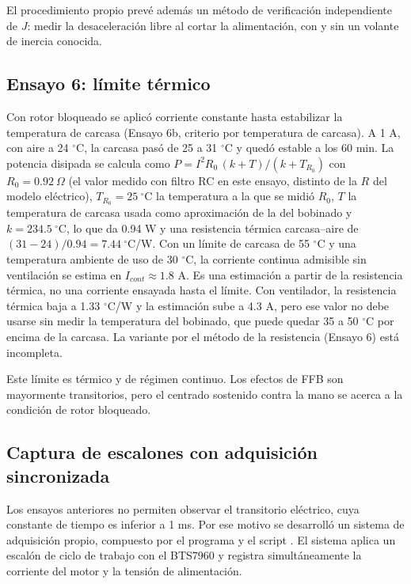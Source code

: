 El procedimiento propio prevé además un método de verificación independiente de $J$: medir la desaceleración libre al cortar la alimentación, con y sin un volante de inercia conocida.

\subsection{Ensayo 6: límite térmico}
\label{sec:motor775_e6}
Con rotor bloqueado se aplicó corriente constante hasta estabilizar la temperatura de carcasa (Ensayo 6b, criterio por temperatura de carcasa). A 1 A, con aire a 24 $^\circ$C, la carcasa pasó de 25 a 31 $^\circ$C y quedó estable a los 60 min. La potencia disipada se calcula como $P = I^2 R_0\,(k + T)/(k + T_{R_0})$ con $R_0 = 0.92\ \Omega$ (el valor medido con filtro RC en este ensayo, distinto de la $R$ del modelo eléctrico), $T_{R_0} = 25\ ^\circ$C la temperatura a la que se midió $R_0$, $T$ la temperatura de carcasa usada como aproximación de la del bobinado y $k = 234.5\ ^\circ$C, lo que da 0.94 W y una resistencia térmica carcasa--aire de $(31 - 24)/0.94 = 7.44\ ^\circ$C/W. Con un límite de carcasa de 55 $^\circ$C y una temperatura ambiente de uso de 30 $^\circ$C, la corriente continua admisible sin ventilación se estima en $I_{cont} \approx 1.8$ A. Es una estimación a partir de la resistencia térmica, no una corriente ensayada hasta el límite. Con ventilador, la resistencia térmica baja a 1.33 $^\circ$C/W y la estimación sube a 4.3 A, pero ese valor no debe usarse sin medir la temperatura del bobinado, que puede quedar 35 a 50 $^\circ$C por encima de la carcasa. La variante por el método de la resistencia (Ensayo 6) está incompleta.

Este límite es térmico y de régimen continuo. Los efectos de FFB son mayormente transitorios, pero el centrado sostenido contra la mano se acerca a la condición de rotor bloqueado.

\subsection{Captura de escalones con adquisición sincronizada}
\label{sec:motor775_captura}
Los ensayos anteriores no permiten observar el transitorio eléctrico, cuya constante de tiempo es inferior a 1 ms. Por ese motivo se desarrolló un sistema de adquisición propio, compuesto por el programa  y el script . El sistema aplica un escalón de ciclo de trabajo con el BTS7960 y registra simultáneamente la corriente del motor y la tensión de alimentación.

